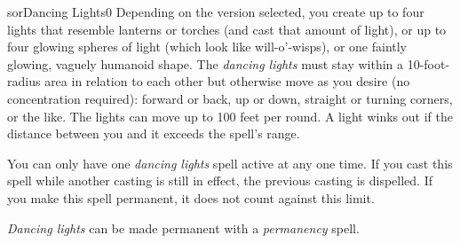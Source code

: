 \begin{spellcard}{sor}{Dancing Lights}{0}
  \spellcardqr{\urlsecondary}
  Depending on the version selected, you create up to four lights that resemble lanterns or torches
  (and cast that amount of light), or up to four glowing spheres of light (which look like will-o'-wisps),
  or one faintly glowing, vaguely humanoid shape.
  The \emph{dancing lights} must stay within a 10-foot-radius area in relation to each other
  but otherwise move as you desire (no concentration required):
  forward or back, up or down, straight or turning corners, or the like.
  The lights can move up to 100 feet per round.
  A light winks out if the distance between you and it exceeds the spell's range.

  You can only have one \emph{dancing lights} spell active at any one time.
  If you cast this spell while another casting is still in effect, the previous casting is dispelled.
  If you make this spell permanent, it does not count against this limit.

  \emph{Dancing lights} can be made permanent with a \emph{permanency} spell.

\end{spellcard}
